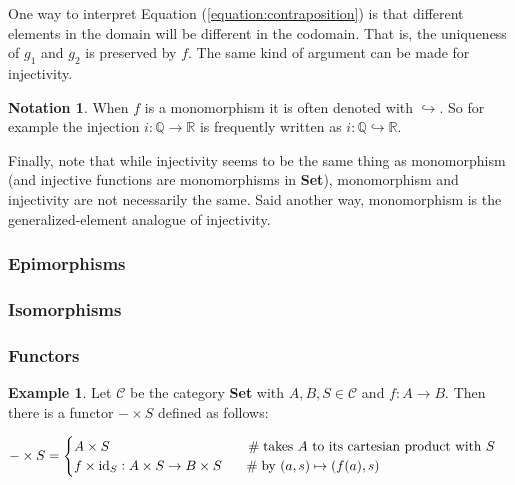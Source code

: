 \documentclass{article}
\theoremstyle{definition}
\newtheorem{example}{Example}[section]
\newtheorem{notation}{Notation}[section]
\begin{document}
\bigskip
\noindent
One way to interpret Equation (\ref{equation:contraposition}) is
that different elements in the domain will be different in the
codomain. That is, the uniqueness of $g_{1}$ and $g_{2}$ is
preserved by $f$. The same kind of argument can be made for
injectivity.

\bigskip
\noindent
\begin{notation} When $f$ is a monomorphism it is
often denoted with $\hookrightarrow$. So for example the
injection $i: \mathbb{Q} \to \mathbb{R}$ is frequently written as
$i: \mathbb{Q} \hookrightarrow \mathbb{R}$.
\end{notation}

\bigskip
\noindent
Finally, note that while injectivity seems to be the same thing
as monomorphism (and injective functions are monomorphisms in
{\bf Set}), monomorphism and injectivity are not necessarily the
same.  Said another way, monomorphism is the generalized-element
analogue of injectivity.

\subsubsection{Epimorphisms}
\label{subsubsection:epimorphisms}

\subsubsection{Isomorphisms}
\label{subsubsection:isomorphisms}

\subsubsection{Functors}
\label{subsubsection:functors}

\vspace{1.0em}
\begin{example}
Let $\mathcal{C}$ be the category {\bf Set} with $A,B,S \in 
\mathcal{C}$ and $f: A \to B$. Then there is a 
functor $- \times S$ defined as follows:


\bigskip
\begin{math}
   - \times S =
   \begin{cases} 
      A \times S                                        
      		\hspace{10.0em} \mathrel{\#} \text{takes $A$ to its cartesian product with $S$} \\
      f \times \text{id}_{S}: A \times S \to B \times S 
      		\hspace{1.55em} \mathrel{\#} \text{by $(a,s) \mapsto (f(a),s)$}
   \end{cases}
\end{math}
\label{example:functor}
\end{example}
\end{document}
